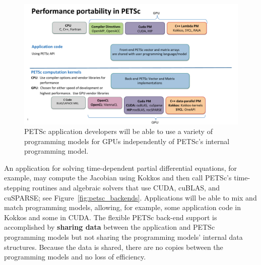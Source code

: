\documentclass[5p,times]{elsarticle}
\begin{document}
\begingroup
\captionsetup[figure]{skip=0pt,belowskip=0pt}
\begin{figure}[H]
\begin{center}
\includegraphics[width=1.0\linewidth]{PETSc-Diagrams_v3.pdf}
\caption{PETSc application developers will be able to use a variety of programming models for GPUs independently of PETSc's internal programming model.}
\label{fig:petsc_accel_support}
\end{center}
\end{figure}
\endgroup
\vskip-10pt

An application for solving time-dependent partial differential
equations, for example, may compute the Jacobian using Kokkos 
and then call PETSc's time-stepping
routines and algebraic solvers that use CUDA, cuBLAS,
and cuSPARSE; see Figure~\ref{fig:petsc_backends}.
Applications will be able to mix and match programming models,
allowing, for example, some application code in Kokkos and some in CUDA. The
flexible PETSc back-end support is accomplished by {\bf sharing data} between the application and PETSc programming models but not
sharing the programming models' internal data structures.
Because the data is shared, there are no copies between the programming models and no loss of efficiency.

\end{document}
